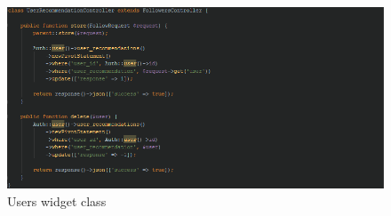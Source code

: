 \begin{figure}[H]
\centering
\includegraphics[width=1\textwidth]{Images/Implementation/UserRecommendationsController}
\caption{Users widget class}
\label{fig:UserRecommendationsController}
\end{figure}